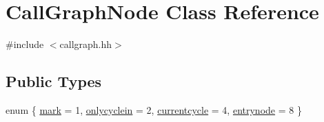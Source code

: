 \hypertarget{class_call_graph_node}{}\section{Call\+Graph\+Node Class Reference}
\label{class_call_graph_node}


{\ttfamily \#include $<$callgraph.\+hh$>$}

\subsection*{Public Types}
\begin{DoxyCompactItemize}
\item 
enum \{ \mbox{\hyperlink{class_call_graph_node_a1b0706ea9d368e38db236437df844a1faac8a0472b933fd34c6eb7680e22cdabb}{mark}} = 1, 
\mbox{\hyperlink{class_call_graph_node_a1b0706ea9d368e38db236437df844a1face9045c6b45ab044475aa669c8ffd2b9}{onlycyclein}} = 2, 
\mbox{\hyperlink{class_call_graph_node_a1b0706ea9d368e38db236437df844a1fa5426b1a70740484c3a65868c022d429f}{currentcycle}} = 4, 
\mbox{\hyperlink{class_call_graph_node_a1b0706ea9d368e38db236437df844a1fa8aab166f322718826c9a20fa44822b6e}{entrynode}} = 8
 \}
\end{DoxyCompactItemize}
